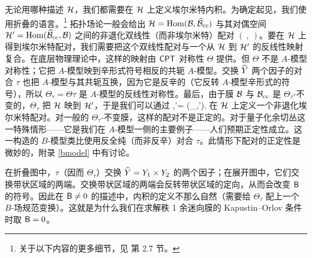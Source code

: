 无论用哪种描述 ${\mathcal H}$，我们都需要在 ${\mathcal H}$ 上定义埃尔米特内积。为确定起见，我们使用折叠的语言。\footnote{关于以下内容的更多细节，见 \cite{GW} 第 2.7 节。} 拓扑场论一般会给出 ${\mathcal H}={\mathrm{Hom}}({\mathcal B},\widehat{{\mathcal B}}_{\mathrm{cc}})$ 与其对偶空间 ${\mathcal H}'={\mathrm{Hom}}(\widehat{{\mathcal B}}_{\mathrm{cc}},{\mathcal B})$ 之间的非退化双线性（而非埃尔米特）配对 $(~,~)$。要在 ${\mathcal H}$ 上得到埃尔米特配对，我们需要把这个双线性配对与一个从 ${\mathcal H}$ 到 ${\mathcal H}'$ 的反线性映射复合。在底层物理理论中，这样的映射由 $\sf{CPT}$ 对称性 $\Theta$ 提供。但 $\Theta$ 不是 $A$-模型对称性；它把 $A$-模型映到辛形式符号相反的共轭 $A$-模型。交换 $\widehat Y$ 两个因子的对合 $\tau$ 也把 $A$-模型与其共轭互换，因为它是反辛的（它反转 $A$-模型辛形式的符号），所以 $\Theta_\tau=\Theta\tau$ 是 $A$-模型的反线性对称性。最后，由于膜 ${\mathcal B}$ 与 ${\mathcal B}_{\mathrm{cc}}$ 是 $\Theta_\tau$-不变的，$\Theta_\tau$ 把 ${\mathcal H}$ 映到 ${\mathcal H}'$，于是我们可以通过
\be\label{hermdef}\la \psi,\psi'\ra= (\Theta_\tau\psi,\psi').\ee
在 ${\mathcal H}$ 上定义一个非退化埃尔米特配对。对一般的 $\Theta_\tau$-不变膜，这样的配对不是正定的。对于量子化余切丛这一特殊情形——它是我们在 $A$-模型一侧的主要例子——人们预期正定性成立。这一构造的 $B$-模型类比使用反全纯（而非反辛）对合 $\tau$。此情形下配对的正定性是微妙的，附录 \ref{bmodel} 中有讨论。

在折叠图中，$\tau$（因而 $\Theta_\tau$）交换 $\widehat Y=Y_1\times Y_2$ 的两个因子；在展开图中，它们交换带状区域的两端。交换带状区域的两端会反转带状区域的定向，从而会改变 ${\sf B}$ 的符号。因此在 ${\sf B}\not=0$ 的描述中，内积的定义不那么自然（需要给 $\Theta_\tau$ 配上一个 $B$-场规范变换）。这就是为什么我们在求解秩 1 余迷向膜的 Kapustin–Orlov 条件时取 ${\sf B}=0$。
